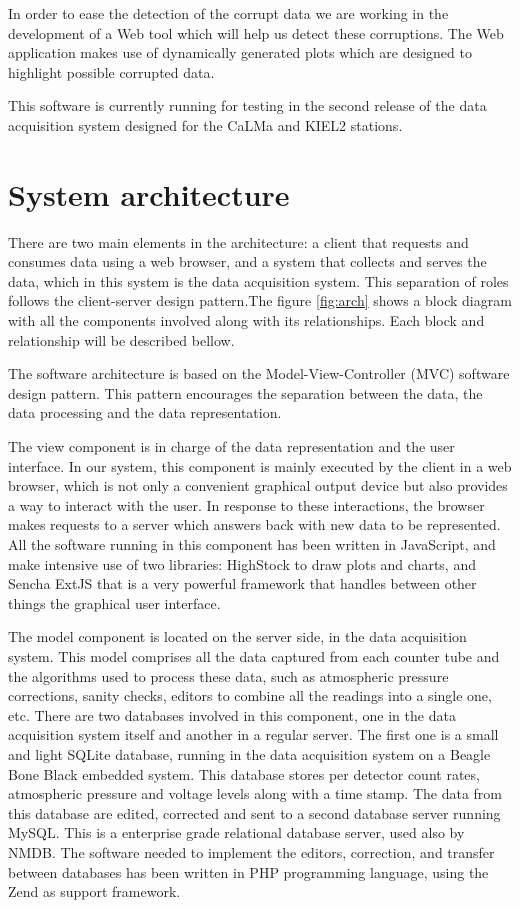 \documentclass[a4paper]{jpconf}
\begin{document}
In order to ease the detection of the corrupt data we are working in the
development of a Web tool which will help us detect these corruptions. The Web
application makes use of dynamically generated plots which are designed to
highlight possible corrupted data.

This software is currently running for testing in the second release of the data
acquisition system\cite{Garcia2014} designed for the CaLMa\cite{Medina2013} and
KIEL2 stations.


\section{System architecture}

There are two main elements in the architecture: a client that requests and
consumes data using a web browser, and a system that collects and serves the
data, which in this system is the data acquisition system. This separation of
roles follows the client-server design pattern\cite{wiki:ClientServer}.The
figure \ref{fig:arch} shows a block diagram with all the components involved
along with its relationships. Each block and relationship will be described
bellow.

The software architecture is based on the Model-View-Controller (MVC) software
design pattern\cite{wiki:MVC}. This pattern encourages the separation between
the data, the data processing and the data representation. 

The view component is in charge of the data representation and the user
interface. In our system, this component is mainly executed by the client in a
web browser, which is not only a convenient graphical output device but also
provides a way to interact with the user. In response to these interactions, the
browser makes requests to a server which answers back with new data to be
represented. All the software running in this component has been written in
JavaScript, and make intensive use of two libraries:
HighStock\cite{web:highstock} to draw plots and charts, and Sencha
ExtJS\cite{web:extjs} that is a very powerful framework that handles between
other things the graphical user interface.

The model component is located on the server side, in the data acquisition
system. This model comprises all the data captured from each counter tube and
the algorithms used to process these data, such as atmospheric pressure
corrections, sanity checks, editors to combine all the readings into a single
one, etc. There are two databases involved in this component, one in the data
acquisition system itself and another in a regular server. The first one is a
small and light SQLite database, running in the data acquisition system on a
Beagle Bone Black embedded system\cite{Garcia2014}. This database stores per
detector count rates, atmospheric pressure and voltage levels along with a time
stamp. The data from this database are edited, corrected and sent to a second
database server running MySQL\cite{web:mysql}. This is a enterprise grade
relational database server, used also by NMDB. The software needed to implement
the editors, correction, and transfer between databases has been written in PHP
programming language, using the Zend\cite{web:zend} as support framework.
\end{document}
